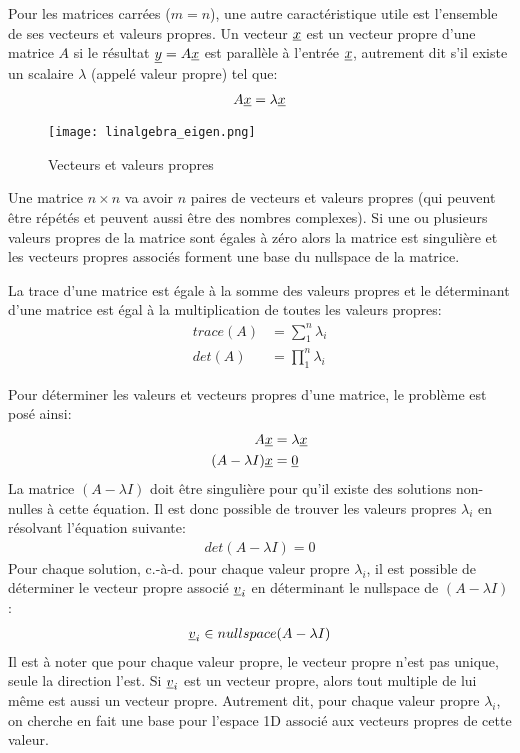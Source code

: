 Pour les matrices carrées ($m=n$), une autre caractéristique utile est l'ensemble de ses vecteurs et valeurs propres. Un vecteur $\underline{x}$ est un vecteur propre d'une matrice $A$ si le résultat $\underline{y} = A \underline{x}$ est parallèle à l'entrée $\underline{x}$, autrement dit s'il existe un scalaire $\lambda$ (appelé valeur propre) tel que:
\begin{align}
	A \underline{x} = \lambda  \underline{x}
\end{align}

\begin{figure}[H]
	\centering
	\texttt{[image: linalgebra\_eigen.png]}
	\caption{Vecteurs et valeurs propres}
	\label{fig:eigen}
\end{figure}

Une matrice $n \times n$ va avoir $n$ paires de vecteurs et valeurs propres (qui peuvent être répétés et peuvent aussi être des nombres complexes). Si une ou plusieurs valeurs propres de la matrice sont égales à zéro alors la matrice est singulière et les vecteurs propres associés forment une base du nullspace de la matrice.

La trace d'une matrice est égale à la somme des valeurs propres et le déterminant d'une matrice est égal à la multiplication de toutes les valeurs propres:
\begin{align}
	trace(A) &= \sum_1^n{ \lambda_i } \\
	det(A)   &= \prod_1^n{ \lambda_i }
\end{align}

Pour déterminer les valeurs et vecteurs propres d'une matrice, le problème est posé ainsi:
\begin{align}
	A \underline{x} &= \lambda  \underline{x} \\
	(A - \lambda I) \underline{x} &= \underline{0}
\end{align}
La matrice $(A - \lambda I)$ doit être singulière pour qu'il existe des solutions non-nulles à cette équation. Il est donc possible de trouver les valeurs propres $\lambda_i$ en résolvant l'équation suivante:
\begin{align}
	det(A - \lambda I) = 0
\end{align}
Pour chaque solution, c.-à-d. pour chaque valeur propre $\lambda_i$, il est possible de déterminer le vecteur propre associé $\underline{v}_i$ en déterminant le nullspace de $(A - \lambda I)$:
\begin{align}
	\underline{v}_i \in nullspace(A - \lambda I)
\end{align}
Il est à noter que pour chaque valeur propre, le vecteur propre n'est pas unique, seule la direction l'est. Si $\underline{v}_i$ est un vecteur propre, alors tout multiple de lui même est aussi un vecteur propre. Autrement dit, pour chaque valeur propre $\lambda_i$, on cherche en fait une base pour l'espace 1D associé aux vecteurs propres de cette valeur.



